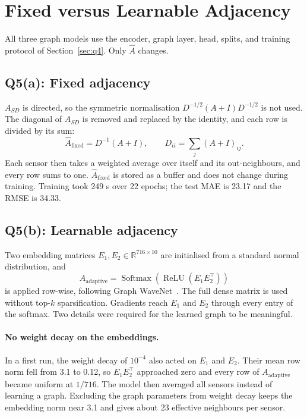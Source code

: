 \documentclass{article}
\newcommand{\Ahat}{\ensuremath{\hat{A}}}
\begin{document}
\section{Fixed versus Learnable Adjacency}
\label{sec:q5}

All three graph models use the encoder, graph layer, head, splits, and training protocol of Section~\ref{sec:q4}. Only $\Ahat$ changes.

\subsection*{Q5(a): Fixed adjacency}

$A_{SD}$ is directed, so the symmetric normalisation $D^{-1/2}(A+I)D^{-1/2}$ is not used. The diagonal of $A_{SD}$ is removed and replaced by the identity, and each row is divided by its sum:
\begin{equation}
  \Ahat_{\text{fixed}}=D^{-1}(A+I),\qquad D_{ii}=\textstyle\sum_j (A+I)_{ij}.
\end{equation}
Each sensor then takes a weighted average over itself and its out-neighbours, and every row sums to one. $\Ahat_{\text{fixed}}$ is stored as a buffer and does not change during training. Training took 249 s over 22 epochs; the test MAE is 23.17 and the RMSE is 34.33.

\subsection*{Q5(b): Learnable adjacency}

Two embedding matrices $E_1,E_2\in\mathbb{R}^{716\times10}$ are initialised from a standard normal distribution, and
\begin{equation}
  A_{\text{adaptive}}=\operatorname{Softmax}\!\left(\operatorname{ReLU}\!\left(E_1E_2^\top\right)\right)
\end{equation}
is applied row-wise, following Graph WaveNet~\citep{wu2019graphwavenet}. The full dense matrix is used without top-$k$ sparsification. Gradients reach $E_1$ and $E_2$ through every entry of the softmax. Two details were required for the learned graph to be meaningful.

\paragraph{No weight decay on the embeddings.}
In a first run, the weight decay of $10^{-4}$ also acted on $E_1$ and $E_2$. Their mean row norm fell from 3.1 to 0.12, so $E_1E_2^\top$ approached zero and every row of $A_{\text{adaptive}}$ became uniform at $1/716$. The model then averaged all sensors instead of learning a graph. Excluding the graph parameters from weight decay keeps the embedding norm near 3.1 and gives about 23 effective neighbours per sensor.
\end{document}
